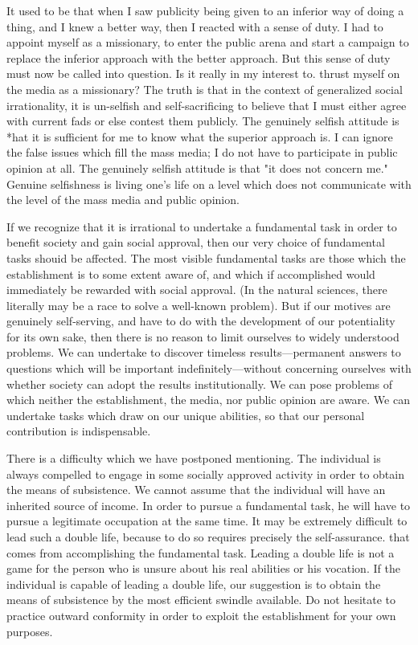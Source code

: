 \documentclass[10pt,twoside,draft]{memoir}
\begin{document}
{{{It used to be that when I saw publicity being given to an inferior way of 
doing a thing, and I knew a better way, then I reacted with a sense of duty. I 
had to appoint myself as a missionary, to enter the public arena and start a 
campaign to replace the inferior approach with the better approach. But this 
sense of duty must now be called into question. Is it really in my interest to. 
thrust myself on the media as a missionary? The truth is that in the context 
of generalized social irrationality, it is un-selfish and self-sacrificing to believe 
that I must either agree with current fads or else contest them publicly. The 
genuinely selfish attitude is *hat it is sufficient for me to know what the 
superior approach is. I can ignore the false issues which fill the mass media; I 
do not have to participate in public opinion at all. The genuinely selfish 
attitude is that "it does not concern me." Genuine selfishness is living one's 
life on a level which does not communicate with the level of the mass media 
and public opinion. 

If we recognize that it is irrational to undertake a fundamental task in 
order to benefit society and gain social approval, then our very choice of 
fundamental tasks shouid be affected. The most visible fundamental tasks 
are those which the establishment is to some extent aware of, and which if 
accomplished would immediately be rewarded with social approval. (In the 
natural sciences, there literally may be a race to solve a well-known problem). 
But if our motives are genuinely self-serving, and have to do with the 
development of our potentiality for its own sake, then there is no reason to 
limit ourselves to widely understood problems. We can undertake to discover 
timeless results---permanent answers to questions which will be important 
indefinitely---without concerning ourselves with whether society can adopt 
the results institutionally. We can pose problems of which neither the 
establishment, the media, nor public opinion are aware. We can undertake 
tasks which draw on our unique abilities, so that our personal contribution is 
indispensable. 

There is a difficulty which we have postponed mentioning. The 
individual is always compelled to engage in some socially approved activity 
in order to obtain the means of subsistence. We cannot assume that the 
individual will have an inherited source of income. In order to pursue a 
fundamental task, he will have to pursue a legitimate occupation at the same 
time. It may be extremely difficult to lead such a double life, because to do 
so requires precisely the self-assurance. that comes from accomplishing the 
fundamental task. Leading a double life is not a game for the person who is 
unsure about his real abilities or his vocation. If the individual is capable of 
leading a double life, our suggestion is to obtain the means of subsistence by 
the most efficient swindle available. Do not hesitate to practice outward 
conformity in order to exploit the establishment for your own purposes. 

}}}
\end{document}
